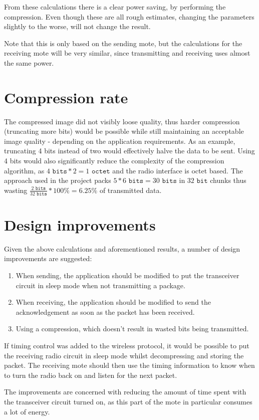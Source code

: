 From these calculations there is a clear power saving, by performing the compression. Even though these are all rough estimates, changing the parameters slightly to the worse, will not change the result.

Note that this is only based on the sending mote, but the calculations for the receiving mote will be very similar, since transmitting and receiving uses almost the same power. 

\section{Compression rate}

The compressed image did not visibly loose quality, thus harder compression (truncating more bits) would be possible while still maintaining an acceptable image quality - depending on the application requirements.
As an example, truncating 4 bits instead of two would effectively halve the data to be sent.
Using 4 bits would also significantly reduce the complexity of the compression algorithm, as $4 \texttt{ bits} * 2= 1 \texttt{ octet}$ and the radio interface is octet based.
The approach used in the project packs $5 * 6\texttt{ bits} = 30\texttt{ bits}$ in $32 \texttt{ bit}$ chunks thus wasting $\frac{2\texttt{ bits}}{32\texttt{ bits}}*100\% = 6.25\%$ of transmitted data.

\section{Design improvements}

Given the above calculations and aforementioned results, a number of design improvements are suggested: 

\begin{enumerate}
\item When sending, the application should be modified to put the transceiver circuit in sleep mode when not transmitting a package. 
\item When receiving, the application should be modified to send the acknowledgement as soon as the packet has been received.
\item Using a compression, which doesn't result in wasted bits being transmitted. 
\end{enumerate} 

If timing control was added to the wireless protocol, it would be possible to put the receiving radio circuit in sleep mode whilst decompressing and storing the packet. The receiving mote should then use the timing information to know when to turn the radio back on and listen for the next packet.

The improvements are concerned with reducing the amount of time spent with the transceiver circuit turned on, as this part of the mote in particular consumes a lot of energy.  
